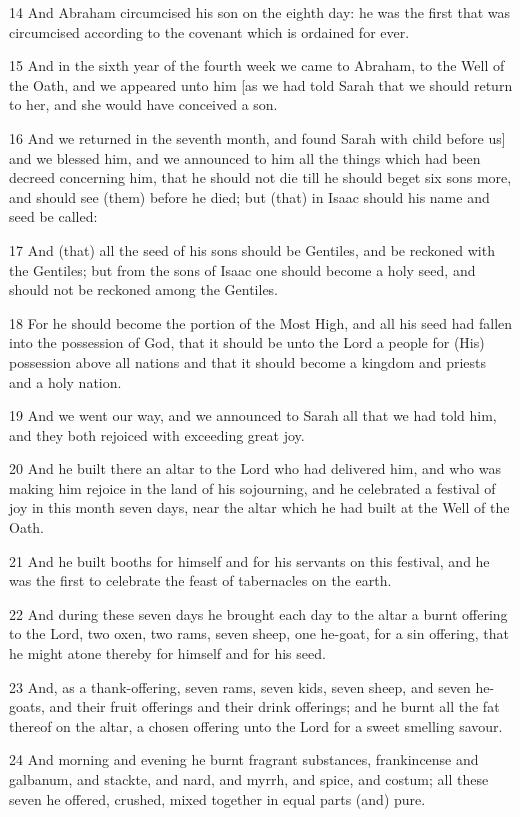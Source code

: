 \par 14 And Abraham circumcised his son on the eighth day: he was the first that was circumcised according to the covenant which is ordained for ever.
\par 15 And in the sixth year of the fourth week we came to Abraham, to the Well of the Oath, and we appeared unto him [as we had told Sarah that we should return to her, and she would have conceived a son.
\par 16 And we returned in the seventh month, and found Sarah with child before us] and we blessed him, and we announced to him all the things which had been decreed concerning him, that he should not die till he should beget six sons more, and should see (them) before he died; but (that) in Isaac should his name and seed be called:
\par 17 And (that) all the seed of his sons should be Gentiles, and be reckoned with the Gentiles; but from the sons of Isaac one should become a holy seed, and should not be reckoned among the Gentiles.
\par 18 For he should become the portion of the Most High, and all his seed had fallen into the possession of God, that it should be unto the Lord a people for (His) possession above all nations and that it should become a kingdom and priests and a holy nation.
\par 19 And we went our way, and we announced to Sarah all that we had told him, and they both rejoiced with exceeding great joy.
\par 20 And he built there an altar to the Lord who had delivered him, and who was making him rejoice in the land of his sojourning, and he celebrated a festival of joy in this month seven days, near the altar which he had built at the Well of the Oath.
\par 21 And he built booths for himself and for his servants on this festival, and he was the first to celebrate the feast of tabernacles on the earth.
\par 22 And during these seven days he brought each day to the altar a burnt offering to the Lord, two oxen, two rams, seven sheep, one he-goat, for a sin offering, that he might atone thereby for himself and for his seed.
\par 23 And, as a thank-offering, seven rams, seven kids, seven sheep, and seven he-goats, and their fruit offerings and their drink offerings; and he burnt all the fat thereof on the altar, a chosen offering unto the Lord for a sweet smelling savour.
\par 24 And morning and evening he burnt fragrant substances, frankincense and galbanum, and stackte, and nard, and myrrh, and spice, and costum; all these seven he offered, crushed, mixed together in equal parts (and) pure.
